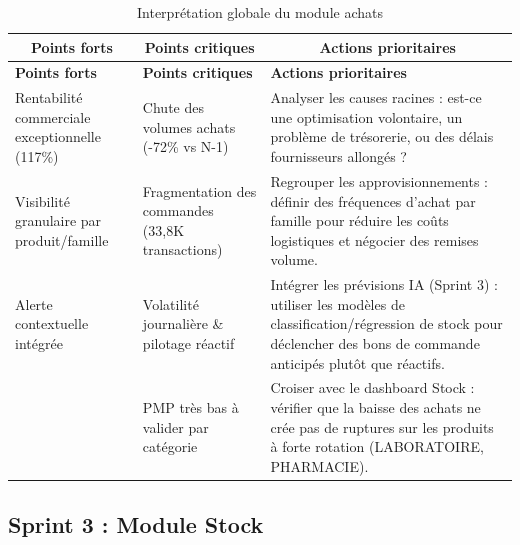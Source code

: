 {\small
\renewcommand{\arraystretch}{1.2}
\setlength{\tabcolsep}{4pt}


\begin{longtable}{|p{4.5cm}|p{4.5cm}|p{6.5cm}|}

\caption{Interprétation globale du module achats} \\

\hline
\multicolumn{1}{|c|}{\textbf{Points forts}} & 
\multicolumn{1}{c|}{\textbf{Points critiques}} & 
\multicolumn{1}{c|}{\textbf{Actions prioritaires}} \\
\hline
\endfirsthead

\hline
\rowcolor{cyan!10}
\textbf{Points forts} & \textbf{Points critiques} & \textbf{Actions prioritaires} \\
\hline
\endhead

\hline
\endfoot

Rentabilité commerciale exceptionnelle (117\%) & Chute des volumes achats (-72\% vs N-1) & Analyser les causes racines : est-ce une optimisation volontaire, un problème de trésorerie, ou des délais fournisseurs allongés ? \\
\hline

Visibilité granulaire par produit/famille & Fragmentation des commandes (33,8K transactions) & Regrouper les approvisionnements : définir des fréquences d'achat par famille pour réduire les coûts logistiques et négocier des remises volume. \\
\hline

Alerte contextuelle intégrée & Volatilité journalière \& pilotage réactif & Intégrer les prévisions IA (Sprint 3) : utiliser les modèles de classification/régression de stock pour déclencher des bons de commande anticipés plutôt que réactifs. \\
\hline

 & PMP très bas à valider par catégorie & Croiser avec le dashboard Stock : vérifier que la baisse des achats ne crée pas de ruptures sur les produits à forte rotation (LABORATOIRE, PHARMACIE). \\
\hline

\end{longtable}
}
\subsection{Sprint 3 : Module Stock}

